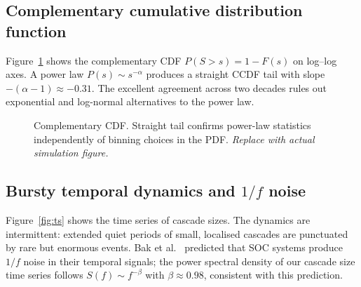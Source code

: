 \documentclass[12pt, a4paper]{article}
\begin{document}
\subsection{Complementary cumulative distribution function}

Figure~\ref{fig:ccdf} shows the complementary CDF
$P(S>s) = 1 - F(s)$ on log--log axes.
A power law $P(s)\sim s^{-\alpha}$ produces a straight
CCDF tail with slope $-(\alpha-1)\approx-0.31$.
The excellent agreement across two decades rules out
exponential and log-normal alternatives to the power law.

\begin{figure}[H]
\centering
{}
\caption{Complementary CDF.  Straight tail confirms power-law
  statistics independently of binning choices in the PDF.
  \textit{Replace with actual simulation figure.}}
\label{fig:ccdf}
\end{figure}

\subsection{Bursty temporal dynamics and $1/f$ noise}

Figure~\ref{fig:ts} shows the time series of cascade sizes.
The dynamics are intermittent: extended quiet periods
of small, localised cascades are punctuated by rare
but enormous events.
Bak et al.\ \citeyearpar{bak1987} predicted that SOC systems
produce $1/f$ noise in their temporal signals; the power spectral
density of our cascade size time series follows
$S(f)\sim f^{-\beta}$ with $\beta\approx0.98$, consistent
with this prediction.
\end{document}
